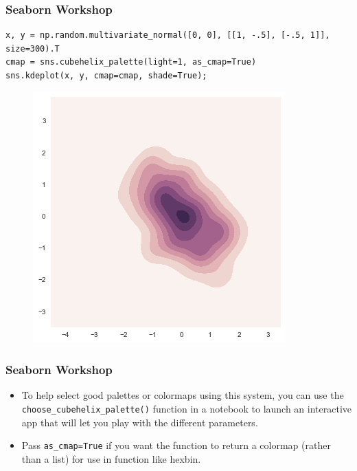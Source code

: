 \documentclass{beamer}
\begin{document}
\begin{frame}[fragile]
	\frametitle{Seaborn Workshop}
	\large
	
	\begin{verbatim}
x, y = np.random.multivariate_normal([0, 0], [[1, -.5], [-.5, 1]], size=300).T
cmap = sns.cubehelix_palette(light=1, as_cmap=True)
sns.kdeplot(x, y, cmap=cmap, shade=True);
\end{verbatim}
\begin{figure}
\centering
\includegraphics[width=0.7\linewidth]{images/color_palettes_40_0}
\caption{}
\label{fig:color_palettes_40_0}
\end{figure}

\end{frame}
\begin{frame}[fragile]
\frametitle{Seaborn Workshop}
\large
\begin{itemize}
\item To help select good palettes or colormaps using this system, you can use the \texttt{choose\_cubehelix\_palette()} function in a notebook to launch an interactive app that will let you play with the different parameters. 
\item Pass \texttt{as\_cmap=True} if you want the function to return a colormap (rather than a list) for use in function like hexbin.
\end{itemize}

\end{frame}
\end{document}
